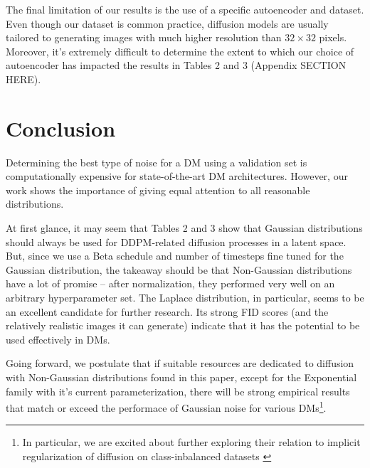 \documentclass[10pt,twocolumn,letterpaper]{article}
\begin{document}
The final limitation of our results is the use of a specific autoencoder and dataset. Even though our dataset is common practice, diffusion models are usually tailored to generating images with much higher resolution than $32\times 32$ pixels. Moreover, it's extremely difficult to determine the extent to which our choice of autoencoder has impacted the results in Tables 2 and 3 (Appendix SECTION HERE).

\section{Conclusion}
\label{sec:intro}

Determining the best type of noise for a DM using a validation set is computationally expensive for state-of-the-art DM architectures. However, our work shows the importance of giving equal attention to all reasonable distributions.

At first glance, it may seem that Tables 2 and 3 show that Gaussian distributions should always be used for DDPM-related diffusion processes in a latent space. But, since we use a Beta schedule and number of timesteps fine tuned for the Gaussian distribution, the takeaway should be that Non-Gaussian distributions have a lot of promise -- after normalization, they performed very well on an arbitrary hyperparameter set. The Laplace distribution, in particular, seems to be an excellent candidate for further research. Its strong FID scores (and the relatively realistic images it can generate) indicate that it has the potential to be used effectively in DMs. 

Going forward, we postulate that if suitable resources are dedicated to diffusion with Non-Gaussian distributions found in this paper, except for the Exponential family with it's current parameterization, there will be strong empirical results that match or exceed the performace of Gaussian noise for various DMs\footnote{In particular, we are excited about further exploring their relation to implicit regularization of diffusion on class-inbalanced datasets \cite{qin2023classbalancing}}.

{\small


}

\pagebreak
\appendix
\end{document}
